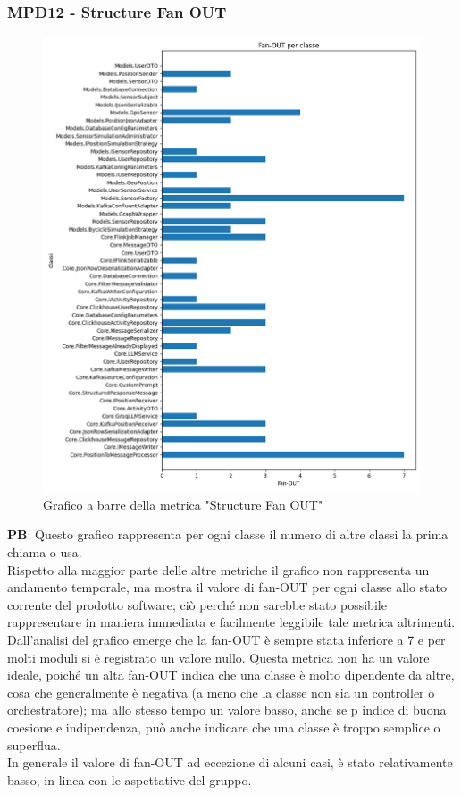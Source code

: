 \documentclass[10pt]{article}
\begin{document}
\begin{justify}
\subsubsection{MPD12 - Structure Fan OUT}

\begin{figure}[H]
  \centering
  \includegraphics[width=0.9\linewidth]{metrics_fan_out.png}
  \caption{Grafico a barre della metrica "Structure Fan OUT"}
\end{figure}

\textbf{PB}: Questo grafico rappresenta per ogni classe il numero di altre classi la prima chiama o usa.\\
Rispetto alla maggior parte delle altre metriche il grafico non rappresenta un andamento temporale, ma mostra il valore di fan-OUT per ogni classe allo stato 
corrente del prodotto software; ciò perché non sarebbe stato possibile rappresentare in maniera immediata e  facilmente leggibile tale metrica altrimenti.\\
Dall'analisi del grafico emerge che la fan-OUT è sempre stata inferiore a 7 e per molti moduli si è registrato un valore nullo. Questa metrica non ha un valore ideale,
poiché un alta fan-OUT indica che una classe è molto dipendente da altre, cosa che generalmente è negativa (a meno che la classe non sia un controller o orchestratore); 
ma allo stesso tempo un valore basso, anche se p indice di buona coesione e indipendenza, può anche indicare che una classe è troppo semplice o superflua.\\
In generale il valore di fan-OUT ad eccezione di alcuni casi, è stato relativamente basso, in linea con le aspettative del gruppo.\\



\end{justify}
\end{document}
